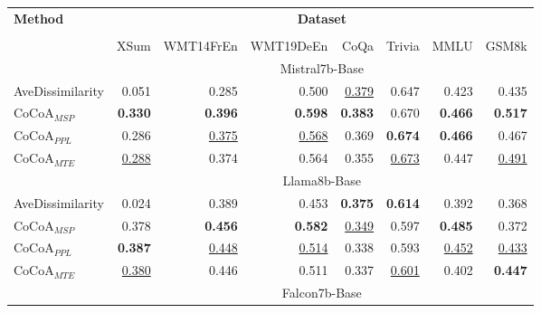 

\begin{table*}[h!]
\footnotesize
\centering

\begin{tabular}{lrrrrrrr}
\toprule
    \multirow{2}{*}{\textbf{Method}}  & \multicolumn{7}{c}{\textbf{Dataset}}  \\ 
      \cmidrule(lr){2-8}  \\
  & XSum & WMT14FrEn & WMT19DeEn & CoQa & Trivia & MMLU & GSM8k \\
  \midrule

\rowcolor[gray]{0.9} & \multicolumn{7}{c}{Mistral7b-Base} \\

\midrule

AveDissimilarity & 0.051& 0.285& 0.500& \underline{0.379}& 0.647& 0.423& 0.435\\
$\text{CoCoA}_{MSP}$ & \textbf{0.330}& \textbf{0.396}& \textbf{0.598}& \textbf{0.383}& 0.670& \textbf{0.466}& \textbf{0.517}\\
$\text{CoCoA}_{PPL}$ & 0.286& \underline{0.375}& \underline{0.568}& 0.369& \textbf{0.674}& \textbf{0.466}& 0.467\\
$\text{CoCoA}_{MTE}$ & \underline{0.288}& 0.374& 0.564& 0.355& \underline{0.673}& 0.447& \underline{0.491}\\
\midrule

\rowcolor[gray]{0.9} & \multicolumn{7}{c}{Llama8b-Base} \\

\midrule

AveDissimilarity & 0.024& 0.389& 0.453& \textbf{0.375}& \textbf{0.614}& 0.392& 0.368\\
$\text{CoCoA}_{MSP}$ & 0.378& \textbf{0.456}& \textbf{0.582}& \underline{0.349}& 0.597& \textbf{0.485}& 0.372\\
$\text{CoCoA}_{PPL}$ & \textbf{0.387}& \underline{0.448}& \underline{0.514}& 0.338& 0.593& \underline{0.452}& \underline{0.433}\\
$\text{CoCoA}_{MTE}$ & \underline{0.380}& 0.446& 0.511& 0.337& \underline{0.601}& 0.402& \textbf{0.447}\\
\midrule

\rowcolor[gray]{0.9} & \multicolumn{7}{c}{Falcon7b-Base} \\

\midrule


\end{tabular}
\end{table*}
